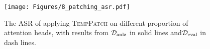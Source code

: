\begin{figure}[t]
  \centering
  \texttt{[image: Figures/8\_patching\_asr.pdf]}
  \caption{The ASR of applying \textsc{TempPatch} on different proportion of attention heads, with results from \({\mathcal{D}}_{\text{anlz}}\) in solid lines and\({\mathcal{D}}_{\text{eval}}\) in dash lines.}
  \label{fig:patching_asr}
\end{figure}
